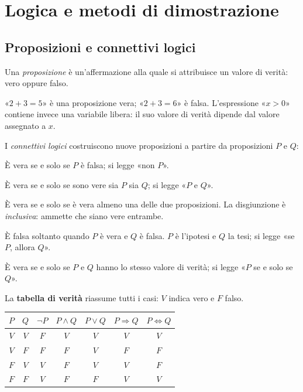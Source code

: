 \chapter{Logica e metodi di dimostrazione}
\label{cap:logica}

\section{Proposizioni e connettivi logici}

Una \emph{proposizione} è un'affermazione alla quale si attribuisce un valore di verità: vero oppure falso.

\begin{esempio}
«$2+3=5$» è una proposizione vera; «$2+3=6$» è falsa. L'espressione «$x>0$» contiene invece una variabile libera: il suo valore di verità dipende dal valore assegnato a $x$.
\end{esempio}

I \emph{connettivi logici} costruiscono nuove proposizioni a partire da proposizioni $P$ e $Q$:
\begin{description}[itemsep=.3em,topsep=.4em]
  \item[Negazione: $\neg P$.] È vera se e solo se $P$ è falsa; si legge «non $P$».
  \item[Congiunzione: $P\land Q$.] È vera se e solo se sono vere sia $P$ sia $Q$; si legge «$P$ e $Q$».
  \item[Disgiunzione: $P\lor Q$.] È vera se e solo se è vera almeno una delle due proposizioni. La disgiunzione è \emph{inclusiva}: ammette che siano vere entrambe.
  \item[Implicazione: $P\Rightarrow Q$.] È falsa soltanto quando $P$ è vera e $Q$ è falsa. $P$ è l'ipotesi e $Q$ la tesi; si legge «se $P$, allora $Q$».
  \item[Doppia implicazione: $P\Leftrightarrow Q$.] È vera se e solo se $P$ e $Q$ hanno lo stesso valore di verità; si legge «$P$ se e solo se $Q$».
\end{description}

La \textbf{tabella di verità} riassume tutti i casi: $V$ indica vero e $F$ falso.
\begin{center}
  \renewcommand{\arraystretch}{1.2}
  \begin{tabular}{ccccccc}
    \toprule
    $P$ & $Q$ & $\neg P$ & $P\land Q$ & $P\lor Q$ & $P\Rightarrow Q$ & $P\Leftrightarrow Q$\\
    \midrule
    $V$ & $V$ & $F$ & $V$ & $V$ & $V$ & $V$\\
    $V$ & $F$ & $F$ & $F$ & $V$ & $F$ & $F$\\
    $F$ & $V$ & $V$ & $F$ & $V$ & $V$ & $F$\\
    $F$ & $F$ & $V$ & $F$ & $F$ & $V$ & $V$\\
    \bottomrule
  \end{tabular}
\end{center}

